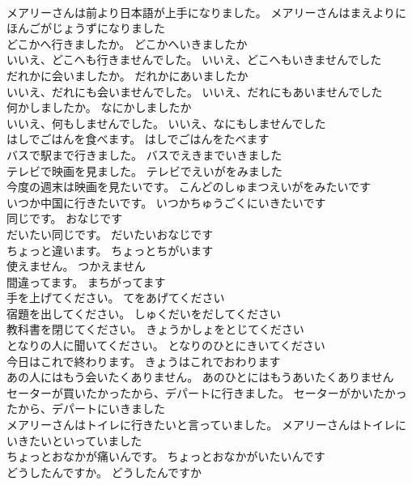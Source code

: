 \documentclass[8pt]{extreport}
\begin{document}
\begin{CJK}{UTF8}{min}
\\	メアリーさんは前より日本語が上手になりました。	メアリーさんはまえよりにほんごがじょうずになりました 
\\	どこかへ行きましたか。	どこかへいきましたか 
\\	いいえ、どこへも行きませんでした。	いいえ、どこへもいきませんでした 
\\	だれかに会いましたか。	だれかにあいましたか 
\\	いいえ、だれにも会いませんでした。	いいえ、だれにもあいませんでした 
\\	何かしましたか。	なにかしましたか 
\\	いいえ、何もしませんでした。	いいえ、なにもしませんでした 
\\	はしでごはんを食べます。	はしでごはんをたべます 
\\	バスで駅まで行きました。	バスでえきまでいきました 
\\	テレビで映画を見ました。	テレビでえいがをみました 
\\	今度の週末は映画を見たいです。	こんどのしゅまつえいがをみたいです 
\\	いつか中国に行きたいです。	いつかちゅうごくにいきたいです 
\\	同じです。	おなじです 
\\	だいたい同じです。	だいたいおなじです 
\\	ちょっと違います。	ちょっとちがいます 
\\	使えません。	つかえません 
\\	間違ってます。	まちがってます 
\\	手を上げてください。	てをあげてください 
\\	宿題を出してください。	しゅくだいをだしてください 
\\	教科書を閉じてください。	きょうかしょをとじてください 
\\	となりの人に聞いてください。	となりのひとにきいてください 
\\	今日はこれで終わります。	きょうはこれでおわります 
\\	あの人にはもう会いたくありません。	あのひとにはもうあいたくありません 
\\	セーターが買いたかったから、デパートに行きました。	セーターがかいたかったから、デパートにいきました 
\\	メアリーさんはトイレに行きたいと言っていました。	メアリーさんはトイレにいきたいといっていました 
\\	ちょっとおなかが痛いんです。	ちょっとおなかがいたいんです 
\\	どうしたんですか。	どうしたんですか 

\end{CJK}
\end{document}
